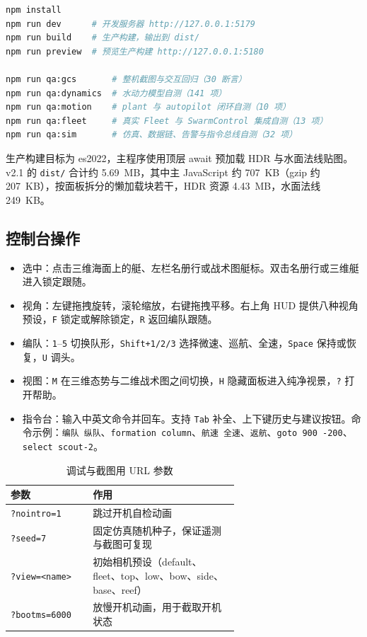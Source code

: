 \documentclass[UTF8, a4paper, 11pt]{ctexart}
\newcommand{\file}[1]{\texttt{#1}}
\begin{document}
\begin{lstlisting}[language=bash, caption={安装、运行与质量验证命令}, label={lst:run}]
npm install
npm run dev      # 开发服务器 http://127.0.0.1:5179
npm run build    # 生产构建，输出到 dist/
npm run preview  # 预览生产构建 http://127.0.0.1:5180

npm run qa:gcs       # 整机截图与交互回归（30 断言）
npm run qa:dynamics  # 水动力模型自测（141 项）
npm run qa:motion    # plant 与 autopilot 闭环自测（10 项）
npm run qa:fleet     # 真实 Fleet 与 SwarmControl 集成自测（13 项）
npm run qa:sim       # 仿真、数据链、告警与指令总线自测（32 项）
\end{lstlisting}

生产构建目标为 es2022，主程序使用顶层 await 预加载 HDR 与水面法线贴图。v2.1 的 \file{dist/} 合计约 5.69~MB，其中主 JavaScript 约 707~KB（gzip 约 207~KB），按面板拆分的懒加载块若干，HDR 资源 4.43~MB，水面法线 249~KB。

\subsection{控制台操作}

\begin{itemize}
  \item 选中：点击三维海面上的艇、左栏名册行或战术图艇标。双击名册行或三维艇进入锁定跟随。
  \item 视角：左键拖拽旋转，滚轮缩放，右键拖拽平移。右上角 HUD 提供八种视角预设，\texttt{F} 锁定或解除锁定，\texttt{R} 返回编队跟随。
  \item 编队：\texttt{1}--\texttt{5} 切换队形，\texttt{Shift+1/2/3} 选择微速、巡航、全速，\texttt{Space} 保持或恢复，\texttt{U} 调头。
  \item 视图：\texttt{M} 在三维态势与二维战术图之间切换，\texttt{H} 隐藏面板进入纯净视景，\texttt{?} 打开帮助。
  \item 指令台：输入中英文命令并回车。支持 \texttt{Tab} 补全、上下键历史与建议按钮。命令示例：\texttt{编队 纵队}、\texttt{formation column}、\texttt{航速 全速}、\texttt{返航}、\texttt{goto 900 -200}、\texttt{select scout-2}。
\end{itemize}

\begin{table}[H]
\centering
\caption{调试与截图用 URL 参数}
\label{tab:urlparams}
\small
\begin{tabular}{@{}l p{0.64\linewidth}@{}}
\toprule
\textbf{参数} & \textbf{作用} \\
\midrule
\file{?nointro=1} & 跳过开机自检动画 \\
\file{?seed=7} & 固定仿真随机种子，保证遥测与截图可复现 \\
\file{?view=<name>} & 初始相机预设（default、fleet、top、low、bow、side、base、reef） \\
\file{?bootms=6000} & 放慢开机动画，用于截取开机状态 \\
\bottomrule
\end{tabular}
\end{table}
\end{document}
